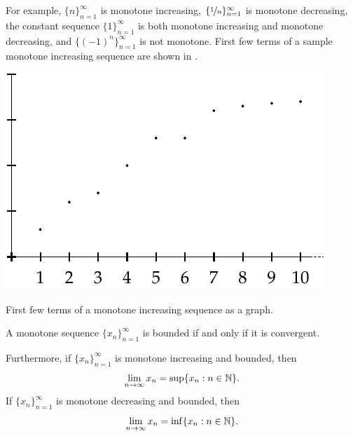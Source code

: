 For example,
$\{ n \}_{n=1}^\infty$ is monotone increasing,
$\{ \nicefrac{1}{n} \}_{n=1}^\infty$ is monotone decreasing,
the constant sequence $\{ 1 \}_{n=1}^\infty$ is both monotone increasing and monotone
decreasing, and $\bigl\{ {(-1)}^n \bigr\}_{n=1}^\infty$ is not monotone.
First few terms of a sample monotone increasing sequence
are shown in 
.

\begin{myfigureht}
\includegraphics{figures/sequence-increasing}
\caption{First few terms of a monotone increasing sequence as a
graph.\label{figsequenceincreasing}}
\end{myfigureht}

\begin{prop} \label{prop:monotoneconv}
A monotone sequence $\{ x_n \}_{n=1}^\infty$ is bounded if and only if it is convergent.

Furthermore, if $\{ x_n \}_{n=1}^\infty$ is monotone increasing and bounded, then
\begin{equation*}
\lim_{n\to \infty} x_n = \sup \{ x_n : n \in {\mathbb{N}} \} .
\end{equation*}
If $\{ x_n \}_{n=1}^\infty$ is monotone decreasing and bounded, then
\begin{equation*}
\lim_{n\to \infty} x_n = \inf \{ x_n : n \in {\mathbb{N}} \} .
\end{equation*}
\end{prop}

